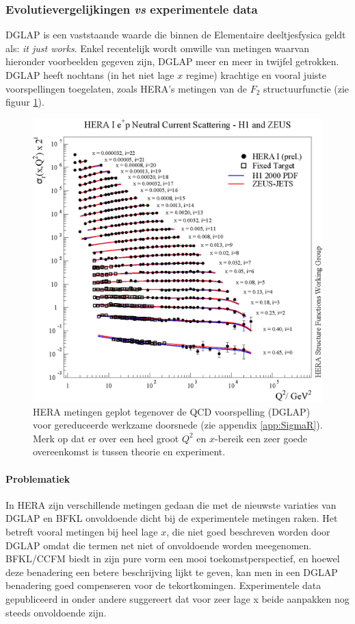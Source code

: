 \documentclass[a4paper,11pt]{article}
\numberwithin{equation}{section} %
\begin{document}
    \subsubsection{Evolutievergelijkingen \textit{vs} experimentele data} \label{sec:QCDvsExperiment}
DGLAP is een vaststaande waarde die binnen de Elementaire deeltjesfysica geldt als: \textit{it just works}.
Enkel recentelijk wordt omwille van metingen waarvan hieronder voorbeelden gegeven zijn, DGLAP meer en meer in twijfel getrokken.
DGLAP heeft nochtans (in het niet lage $x$ regime) krachtige en vooral juiste voorspellingen toegelaten, zoals HERA’s metingen van de $F_2$ structuurfunctie (zie figuur \ref{fig:SC}).
\begin{figure} [H]
  \begin{center}
    \includegraphics[scale=1]{Afbeeldingen/HERAF2.eps}
    \caption{HERA metingen geplot tegenover de QCD voorspelling (DGLAP) voor gereduceerde werkzame doorsnede (zie appendix \ref{app:SigmaR}). Merk op dat er over een heel groot $Q^2$ en $x$-bereik een zeer goede overeenkomst is tussen theorie en experiment. \cite{VanMechelen}}
   \label{fig:SC}
  \end{center}
\end{figure}

      \paragraph{Problematiek}
In HERA zijn verschillende metingen gedaan die met de nieuwste variaties van DGLAP en BFKL onvoldoende dicht bij de experimentele metingen raken.
Het betreft vooral metingen bij heel lage $x$, die niet goed beschreven worden door DGLAP omdat die termen net niet  of onvoldoende worden meegenomen.
BFKL/CCFM biedt in zijn pure vorm een mooi toekomstperspectief, en hoewel deze benadering een betere beschrijving lijkt te geven, kan men in een DGLAP benadering goed compenseren voor de tekortkomingen.
Experimentele data gepubliceerd in onder andere \cite{Kiesling} suggereert dat voor zeer lage x beide aanpakken nog steeds onvoldoende zijn.
\end{document}
